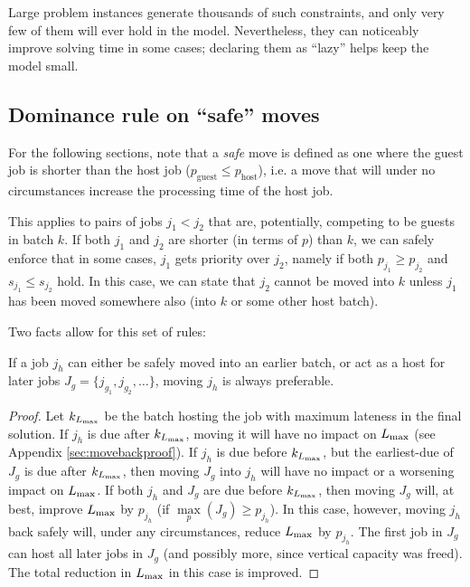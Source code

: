 \documentclass[13pt, letterpaper, oneside]{book}
\begin{document}
Large problem instances generate thousands of such constraints, and only very
few of them will ever hold in the model. Nevertheless, they can noticeably
improve solving time in some cases; declaring them as ``lazy'' helps keep
the model small.

\subsection{Dominance rule on ``safe'' moves}
\label{sec:dominance-safe}
For the following sections, note that a \textit{safe} move is defined as one
where the guest job is shorter than the host job ($p_\text{guest} \leq
p_\text{host}$), i.e. a move that will under no circumstances increase the
processing time of the host job.

This applies to pairs of jobs $j_1 < j_2$ that are, potentially, competing
to be guests in batch $k$. If both $j_1$ and $j_2$ are shorter (in terms of $p$)
than $k$, we can safely enforce that in some cases, $j_1$ gets priority over
$j_2$, namely if both $p_{j_1} \geq p_{j_2}$ and $s_{j_1} \leq s_{j_2}$ hold. In
this case, we can state that $j_2$ cannot be moved into $k$ unless $j_1$ has
been moved somewhere also (into $k$ or some other host batch).

Two facts allow for this set of rules:
\begin{proposition}If a job $j_h$ can either be safely moved into an earlier batch,
\textrm{or} act as a host for later jobs $J_g = \{j_{g_1}, j_{g_2}, \dots\}$,
moving $j_h$ is always preferable. \label{prop:moveisbetter}

\begin{proof}
Let $k_{L_{\text{max}}}$ be the batch hosting the job with maximum lateness in the final
solution. If $j_h$ is due after $k_{L_{\text{max}}}$, moving it will have no impact on
$L_{\text{max}}$ (see Appendix \ref{sec:movebackproof}). If $j_h$ is due before
$k_{L_{\text{max}}}$, but the earliest-due of $J_g$ is due after $k_{L_{\text{max}}}$, then moving
$J_g$ into $j_h$ will have no impact or a worsening impact on $L_{\text{max}}$. If both
$j_h$ and $J_g$ are due before $k_{L_{\text{max}}}$, then moving $J_g$ will, at best,
improve $L_{\text{max}}$ by $p_{j_h}$ (if $\underset{p}{\max}(J_g) \geq p_{j_h}$). In
this case, however, moving $j_h$ back safely will, under any circumstances,
reduce $L_{\text{max}}$ by $p_{j_h}$. The first job in $J_g$ can host all later jobs in
$J_g$ (and possibly more, since vertical capacity was freed). The total
reduction in $L_{\text{max}}$ in this case is improved.
\end{proof}
\end{proposition}
\end{document}
